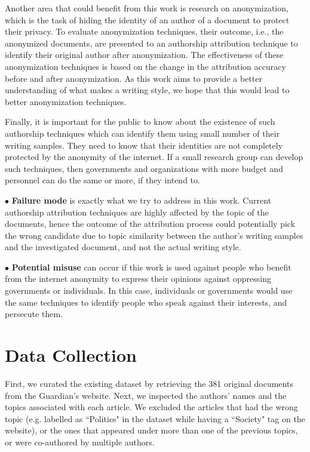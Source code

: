\documentclass[11pt]{article}
\begin{document}
Another area that could benefit from this work is research on anonymization, which is the task of hiding the identity of an author of a document to protect their privacy. To evaluate anonymization techniques, their outcome, i.e., the anonymized documents, are presented to an authorship attribution technique to identify their original author after anonymization. The effectiveness of these anonymization techniques is based on the change in the attribution accuracy before and after anonymization. As this work aims to provide a better understanding of what makes a writing style, we hope that this would lead to better anonymization techniques. 

Finally, it is important for the public to know about the existence of such authorship techniques which can identify them using small number of their writing samples. They need to know that their identities are not completely protected by the anonymity of the internet. If a small research group can develop such techniques, then governments and organizations with more budget and personnel can do the same or more, if they intend to. 

\noindent$\bullet$ \textbf{Failure mode} is exactly what we try to address in this work. Current authorship attribution techniques are highly affected by the topic of the documents, hence the outcome of the attribution process could potentially pick the wrong candidate due to topic similarity between the author's writing samples and the investigated document, and not the actual writing style. 

\noindent$\bullet$ \textbf{Potential misuse} can occur if this work is used against people who benefit from the internet anonymity to express their opinions against oppressing governments or individuals. In this case, individuals or governments would use the same techniques to identify people who speak against their interests, and persecute them. 
\newpage



\appendix

\onecolumn

\section{Data Collection\label{dataColl}}
First, we curated the existing dataset by retrieving the 381 original documents from the Guardian's website. Next, we inspected the authors' names and the topics associated with each article. We excluded the articles that had the wrong topic (e.g. labelled as ``Politics" in the dataset while having a ``Society" tag on the website), or the ones that appeared under more than one of the previous topics, or were co-authored by multiple authors. 
\end{document}
